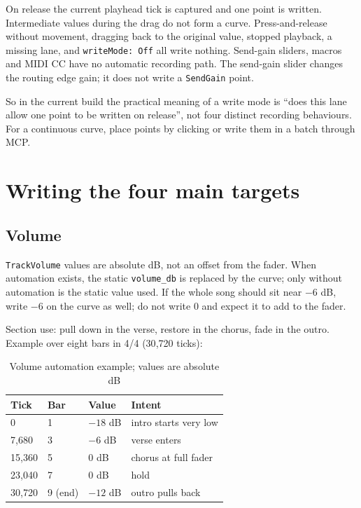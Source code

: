 On release the current playhead tick is captured and one point is written. Intermediate values during the drag do not form a curve. Press-and-release without movement, dragging back to the original value, stopped playback, a missing lane, and \texttt{writeMode: Off} all write nothing. Send-gain sliders, macros and MIDI CC have no automatic recording path. The send-gain slider changes the routing edge gain; it does not write a \texttt{SendGain} point.

So in the current build the practical meaning of a write mode is ``does this lane allow one point to be written on release'', not four distinct recording behaviours. For a continuous curve, place points by clicking or write them in a batch through MCP.

\section{Writing the four main targets}

\subsection{Volume}

\texttt{TrackVolume} values are absolute dB, not an offset from the fader. When automation exists, the static \texttt{volume\_db} is replaced by the curve; only without automation is the static value used. If the whole song should sit near $-6$ dB, write $-6$ on the curve as well; do not write $0$ and expect it to add to the fader.

Section use: pull down in the verse, restore in the chorus, fade in the outro. Example over eight bars in 4/4 (30{,}720 ticks):

\begin{table}[htbp]
\centering
\small
\begin{tabular}{@{}llll@{}}
\hline
Tick & Bar & Value & Intent \\
\hline
0 & 1 & $-18$ dB & intro starts very low \\
7{,}680 & 3 & $-6$ dB & verse enters \\
15{,}360 & 5 & $0$ dB & chorus at full fader \\
23{,}040 & 7 & $0$ dB & hold \\
30{,}720 & 9 (end) & $-12$ dB & outro pulls back \\
\hline
\end{tabular}
\caption{Volume automation example; values are absolute dB}
\label{tab:automation-volume-recipe}
\end{table}

